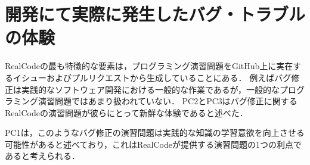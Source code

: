
\section*{開発にて実際に発生したバグ・トラブルの体験}
RealCodeの最も特徴的な要素は，プログラミング演習問題をGitHub上に実在するイシューおよびプルリクエストから生成していることにある．
例えばバグ修正は実践的なソフトウェア開発における一般的な作業であるが，一般的なプログラミング演習問題ではあまり扱われていない．
PC2とPC3はバグ修正に関するRealCodeの演習問題が彼らにとって新鮮な体験であると述べた．





PC1は，このようなバグ修正の演習問題は実践的な知識の学習意欲を向上させる可能性があると述べており，これはRealCodeが提供する演習問題の1つの利点であると考えられる．



